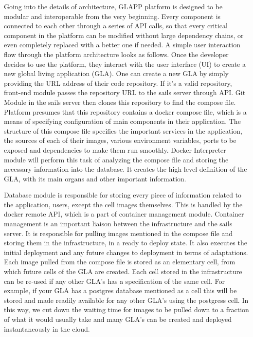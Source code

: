 \documentclass{seal_thesis}
\begin{document}
Going into the details of architecture, GLAPP platform is designed to be modular and interoperable from the very beginning. 
Every component is connected to each other through a series of API calls, so that every critical component in the platform can be modified without large dependency chains, or even completely replaced with a better one if needed.
A simple user interaction flow through the platform architecture looks as follows. 
Once the developer decides to use the platform, they interact with the user interface (UI) to create a new global living application (GLA). 
One can create a new GLA by simply providing the URL address of their code repository. 
If it's a valid repository, front-end module passes the repository URL to the sails server through API. 
Git Module in the sails server then clones this repository to find the compose file. 
Platform presumes that this repository contains a docker compose file, which is a means of specifying configuration of main components in their application. 
The structure of this compose file specifies the important services in the application, the sources of each of their images, various environment variables, ports to be exposed and dependencies to make them run smoothly. 
Docker Interpreter module will perform this task of analyzing the compose file and storing the necessary information into the database. 
It creates the high level definition of the GLA, with its main organs and other important information.
	
Database module is responsible for storing every piece of information related to the application, users, except the cell images themselves. 
This is handled by the docker remote API, which is a part of container management module. Container management is an important liaison between the infrastructure and the sails server. 
It is responsible for pulling images mentioned in the compose file and storing them in the infrastructure, in a ready to deploy state. 
It also executes the initial deployment and any future changes to deployment in terms of adaptations. 
Each image pulled from the compose file is stored as an elementary cell, from which future cells of the GLA are created. 
Each cell stored in the infrastructure can be re-used if any other GLA's has a specification of the same cell. 
For example, if your GLA has a postgres database mentioned as a cell this will be stored and made readily available for any other GLA's using the postgress cell. 
In this way, we cut down the waiting time for images to be pulled down to a fraction of what it would usually take and many GLA's can be created and deployed instantaneously in the cloud.
\end{document}
